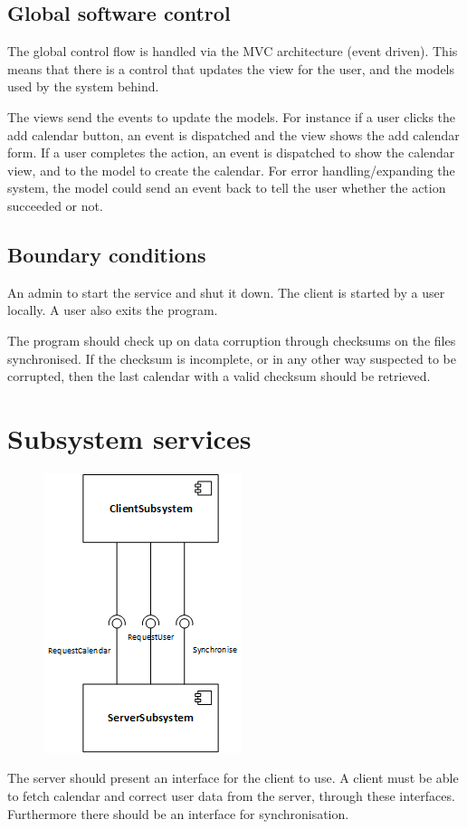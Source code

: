 \documentclass[10pt]{report}
\numberwithin{equation}{section} %
\numberwithin{figure}{section} %
\numberwithin{table}{section} %
\begin{document}
\subsection{Global software control}
The global control flow is handled via the MVC architecture (event driven). This
means that there is a control that updates the view for the user, and the models
used by the system behind.

The views send the events to update the models. For instance if a user
clicks the add calendar button, an event is dispatched and the view shows the
add calendar form. If a user completes the action, an event is dispatched to
show the calendar view, and to the model to create the calendar. For error
handling/expanding the system, the model could send an event back to tell the
user whether the action succeeded or not.

\subsection{Boundary conditions}
An admin to start the service and shut it down.
The client is started by a user locally.
A user also exits the program.

The program should check up on data corruption through checksums on the files
synchronised. If the checksum is incomplete, or in any other way suspected to be
corrupted, then the last calendar with a valid checksum should be retrieved.

\section{Subsystem services}
\begin{center}
  \begin{figure}[H]
    \includegraphics[scale=1.0]{figures/subsystemservices.png}
  \end{figure}
\end{center}

The server should present an interface for the client to use.  A client must be
able to fetch calendar and correct user data from the server, through these
interfaces. Furthermore there should be an interface for synchronisation.

\end{document}
